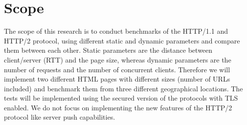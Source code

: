 \section{Scope}
\label{scope}
The scope of this research is to conduct benchmarks of the HTTP/1.1 and HTTP/2 protocol, using different static and dynamic parameters and compare them between each other. Static parameters are the distance between client/server (RTT) and the page size, whereas dynamic parameters are the number of requests and the number of concurrent clients. Therefore we will implement two different HTML pages with different sizes (number of URLs included) and benchmark them from three different geographical locations. The tests will be implemented using the secured version of the protocols with TLS enabled. We do not focus on implementing the new features of the HTTP/2 protocol like server push capabilities.  
